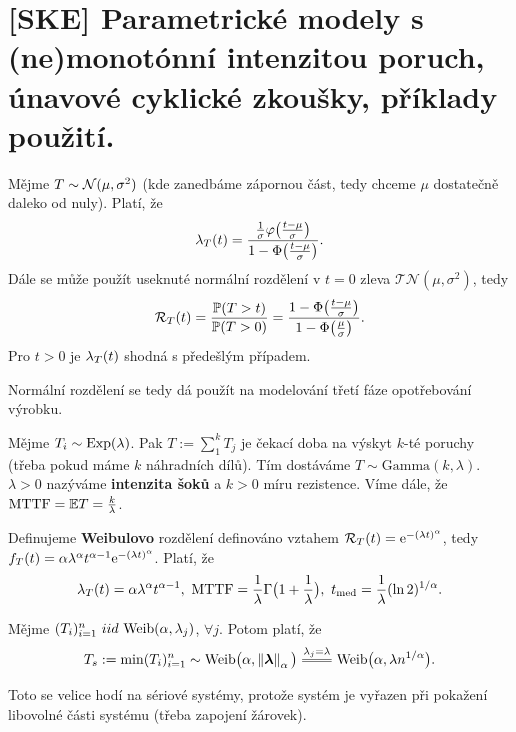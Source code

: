 \chapter{[SKE] Parametrické modely s (ne)monotónní intenzitou poruch, únavové cyklické zkoušky, příklady použití.}

\begin{define}
	Mějme $T\sim \mathcal{N}(\mu, \sigma^2)$ (kde zanedbáme zápornou část, tedy chceme $\mu$ dostatečně daleko od nuly). Platí, že 
	$$ \lambda_T(t)=\frac{\frac{1}{\sigma}\varphi\big(\frac{t-\mu}{\sigma}\big)}{1-\Phi\big(\frac{t-\mu}{\sigma}\big)}.$$
	Dále se může použít useknuté normální rozdělení v $t=0$ zleva 
	$\mathcal{TN}(\mu,\sigma^2)$, tedy 
	$$\mathcal{R}_T(t)=\frac{\mathbb{P}(T>t)}{\mathbb{P}(T>0)}=\frac{1-\Phi\big(\frac{t-\mu}{\sigma}\big)}{1-\Phi\big(\frac{\mu}{\sigma}\big)}.$$
	 Pro $t>0$ je $\lambda_T(t)$ shodná s předešlým případem.
\end{define}

Normální rozdělení se tedy dá použít na modelování třetí fáze opotřebování výrobku.

\begin{define}
Mějme $T_i\sim \mathrm{Exp}(\lambda)$. Pak $T:=\sum_{1}^{k}T_j$ je čekací doba na výskyt $k$-té poruchy (třeba pokud máme $k$ náhradních dílů). Tím dostáváme $T\sim\mathrm{Gamma}(k,\lambda)$. $\lambda>0$ nazýváme \textbf{intenzita šoků} a $k>0$ míru rezistence. Víme dále, že $\mathrm{MTTF}=\mathbb{E} T=\frac{k}{\lambda}$. 
\end{define}

\begin{define}
	Definujeme \textbf{Weibulovo} rozdělení definováno vztahem $\mathcal{R}_T(t)=\mathrm{e}^{-(\lambda t)^\alpha}$, tedy $f_T(t)=\alpha \lambda^\alpha t^{\alpha-1}\mathrm{e}^{-(\lambda t)^\alpha}$. Platí, že
	$$ \lambda_T(t)=\alpha\lambda^\alpha t^{\alpha-1},~\mathrm{MTTF}=\frac{1}{\lambda}\Gamma\big(1+\frac{1}{\lambda}\big),~t_\mathrm{med}=\frac{1}{\lambda}(\ln2)^{1/\alpha}.$$
\end{define}

\begin{theorem}
	Mějme $(T_i)_{i=1}^n~iid~\mathrm{Weib}(\alpha,\lambda_j)$, $\forall j$. Potom platí, že 
	$$ T_s:=\min(T_i)_{i=1}^n \sim 
	\Weib\big(\alpha,\left\|\boldsymbol{\lambda}\right\|_\alpha\big)\equal{\lambda_j=\lambda}\Weib\big(\alpha,\lambda
	 n^{1/\alpha}\big).$$
\end{theorem}

Toto se velice hodí na sériové systémy, protože systém je vyřazen při pokažení libovolné části systému (třeba zapojení žárovek).

